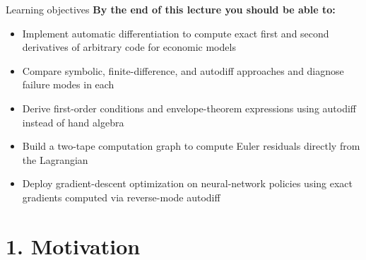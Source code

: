 \documentclass[aspectratio=169,11pt]{beamer}
\begin{document}
\begin{frame}{Learning objectives}
\textbf{By the end of this lecture you should be able to:}
\begin{itemize}
  \item Implement automatic differentiation to compute exact first and second derivatives of arbitrary code for economic models
  \item Compare symbolic, finite-difference, and autodiff approaches and diagnose failure modes in each
  \item Derive first-order conditions and envelope-theorem expressions using autodiff instead of hand algebra
  \item Build a two-tape computation graph to compute Euler residuals directly from the Lagrangian
  \item Deploy gradient-descent optimization on neural-network policies using exact gradients computed via reverse-mode autodiff
\end{itemize}
\end{frame}



\section*{1. Motivation}
\end{document}
